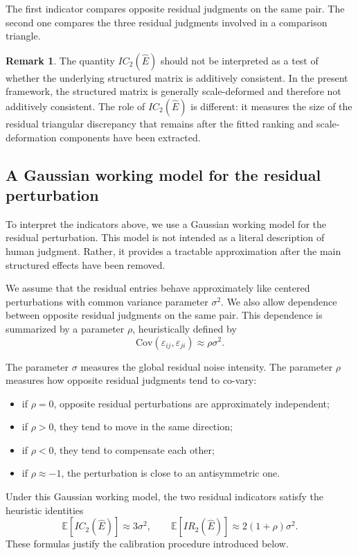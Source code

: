 \documentclass[11pt]{amsart}
\theoremstyle{definition}
\newtheorem{remark}[definition]{Remark}
\theoremstyle{plain}
\numberwithin{equation}{section}
\begin{document}
The first indicator compares opposite residual judgments on the same pair. The second one compares the three residual judgments involved in a comparison triangle.

\begin{remark}
The quantity $IC_2(\widehat E)$ should not be interpreted as a test of whether the underlying structured matrix is additively consistent. In the present framework, the structured matrix is generally scale-deformed and therefore not additively consistent. The role of $IC_2(\widehat E)$ is different: it measures the size of the residual triangular discrepancy that remains after the fitted ranking and scale-deformation components have been extracted.
\end{remark}

\subsection{A Gaussian working model for the residual perturbation}

To interpret the indicators above, we use a Gaussian working model for the residual perturbation. This model is not intended as a literal description of human judgment. Rather, it provides a tractable approximation after the main structured effects have been removed.

We assume that the residual entries behave approximately like centered perturbations with common variance parameter $\sigma^2$. We also allow dependence between opposite residual judgments on the same pair. This dependence is summarized by a parameter $\rho$, heuristically defined by
\[
\mathrm{Cov}(\varepsilon_{ij},\varepsilon_{ji})\approx \rho\sigma^2.
\]

The parameter $\sigma$ measures the global residual noise intensity. The parameter $\rho$ measures how opposite residual judgments tend to co-vary:
\begin{itemize}
\item if $\rho=0$, opposite residual perturbations are approximately independent;
\item if $\rho>0$, they tend to move in the same direction;
\item if $\rho<0$, they tend to compensate each other;
\item if $\rho\approx -1$, the perturbation is close to an antisymmetric one.
\end{itemize}

Under this Gaussian working model, the two residual indicators satisfy the heuristic identities
\[
\mathbb E[IC_2(\widehat E)]\approx 3\sigma^2,
\qquad
\mathbb E[IR_2(\widehat E)]\approx 2(1+\rho)\sigma^2.
\]
These formulas justify the calibration procedure introduced below.
\end{document}
